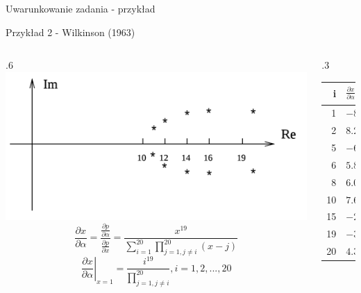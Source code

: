 \begin{frame}{Uwarunkowanie zadania - przykład}
	\begin{exampleblock}{Przykład 2 - Wilkinson (1963)}
    \begin{columns}
    	\begin{column}{.6\linewidth}
          \centering \includegraphics[width=\linewidth]{img/2/2_4_wilkinson_plot}
          \[
              \frac{
                  \partial x
              }{
                  \partial \alpha
              } = \frac{
                  \frac{\partial p}{\partial \alpha}
              }{
                  \frac{\partial p}{\partial x}
              } = \frac{
                  x^{19}
              }{
                  \sum_{i=1}^{20} \prod_{j=1, j \neq i}^{20} (x-j)
              }
          \]
          \[ 
              \left.
                  \frac{\partial x}{\partial \alpha}
              \right|_{x=1} = \frac{
                  i^{19}
              }{
                  \prod_{j=1, j \neq i}^{20}
              }, i = 1, 2, ..., 20
          \]
    	\end{column}
        \begin{column}{.3\linewidth}
          \begin{tabular}{r | l}
              i & $\left.
                  \frac{\partial x}{\partial \alpha}
              \right|_i$ \\
              \hline
               1 & $-8.2 \cdot 10^{-18}$ \\
               2 & $ 8.2 \cdot 10^{-11}$ \\
               5 & $-6.1 \cdot 10^{-1}$  \\
               6 & $ 5.8 \cdot 10^{1}$   \\
               8 & $ 6.0 \cdot 10^{4}$   \\
              10 & $ 7.6 \cdot 10^{6}$   \\
              15 & $-2.1 \cdot 10^{9}$   \\
              19 & $-3.1 \cdot 10^{8}$   \\
              20 & $ 4.3 \cdot 10^{7}$   \\
          \end{tabular}
        \end{column}
    \end{columns}
    \end{exampleblock}
\end{frame}
